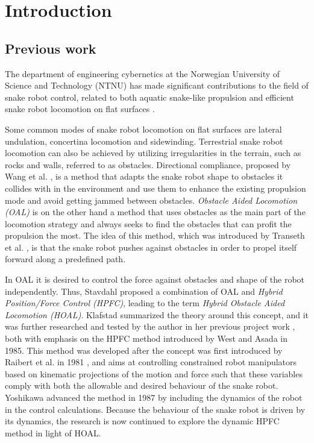 
\chapter{Introduction}\label{Chapter:introduction}

\section{Previous work}

The department of engineering cybernetics at the Norwegian University of Science and Technology (NTNU) has made significant contributions to the field of snake robot control, related to both aquatic snake-like propulsion and efficient snake robot locomotion on flat surfaces \cite{StavdahlNote}.

Some common modes of snake robot locomotion on flat surfaces are lateral undulation, concertina locomotion and sidewinding. Terrestrial snake robot locomotion can also be achieved by utilizing irregularities in the terrain, such as rocks and walls, referred to as obstacles. Directional compliance, proposed by Wang et al. \cite{wang2020directional}, is a method that adapts the snake robot shape to obstacles it collides with in the environment and use them to enhance the existing propulsion mode and avoid getting jammed between obstacles. \textit{Obstacle Aided Locomotion (OAL)} is on the other hand a method that uses obstacles as the main part of the locomotion strategy and always seeks to find the obstacles that can profit the propulsion the most. The idea of this method, which was introduced by Transeth et al. \cite{transeth2008snake}, is that the snake robot pushes against obstacles in order to propel itself forward along a predefined path.


In OAL it is desired to control the force against obstacles and shape of the robot independently. Thus, Stavdahl \cite{StavdahlNote} proposed a combination of OAL and \textit{Hybrid Position/Force Control (HPFC)}, leading to the term \textit{Hybrid Obstacle Aided Locomotion (HOAL)}. Klafstad \cite{TorjusOppg} summarized the theory around this concept, and it was further researched and tested by the author in her previous project work \cite{AtussaProsjektoppgp}, both with emphasis on the HPFC method introduced by West and Asada \cite{west1985method} in 1985. This method was developed after the concept was first introduced by Raibert et al. in 1981 \cite{raibert1981hybrid}, and aims at controlling constrained robot manipulators based on kinematic projections of the motion and force such that these variables comply with both the allowable and desired behaviour of the snake robot. Yoshikawa \cite{yoshikawa1987dynamic} advanced the method in 1987 by including the dynamics of the robot in the control calculations. Because the behaviour of the snake robot is driven by its dynamics, the research is now continued to explore the dynamic HPFC method in light of HOAL. 


